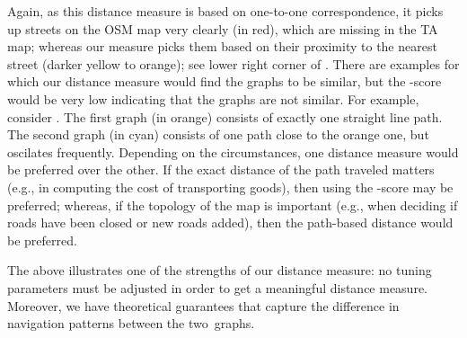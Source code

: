 Again, as this distance measure is based on one-to-one correspondence, it picks
up streets on the OSM map very
clearly (in red), which are missing in the TA map;  whereas our
measure picks them based on their proximity to the nearest street (darker yellow to
orange); see lower right corner of .
There are examples for which our distance measure would find the graphs to be
similar, but the -score would be
very low indicating that the graphs are not similar.  For example, consider
. The first graph (in orange)
consists of exactly one straight line path.
The second graph (in cyan) consists of one path close to the orange one, but
oscilates frequently.  Depending on the circumstances, one distance measure
would be preferred over the other.  If the exact distance of the path traveled
matters (e.g., in computing the cost of transporting goods), then
using the -score may be preferred; whereas, if the topology of the map is
important (e.g., when deciding if roads have been closed or new roads
added), then the path-based distance would be preferred.

The above illustrates one of the strengths of our distance measure: no tuning
parameters must be adjusted in order to
get a meaningful distance measure. Moreover, we have theoretical guarantees that
capture the difference in navigation
patterns between the two~graphs.

